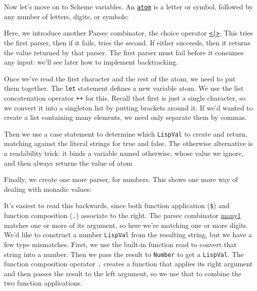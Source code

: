 Now let's move on to Scheme variables. An \href{http://www.schemers.org/Documents/Standards/R5RS/HTML/r5rs-Z-H-5.html\#\%_sec_2.1}{\texttt{atom}} is a letter or symbol, followed by any number of letters, digits, or symbols:
 
 
Here, we introduce another Parsec combinator, the choice operator \href{http://www.cs.uu.nl/~daan/download/parsec/parsec.html\#or}{\texttt{<|>}}. This tries the first parser, then if it fails, tries the second. If either succeeds, then it returns the value returned by that parser. The first parser must fail before it consumes any input: we'll see later how to implement backtracking.
 
Once we've read the first character and the rest of the atom, we need to put them together. The \verb|let| statement defines a new variable atom. We use the list concatenation operator \lstinline|++| for this. Recall that first is just a single character, so we convert it into a singleton list by putting brackets around it. If we'd wanted to create a list containing many elements, we need only separate them by commas.
 
Then we use a case statement to determine which \verb|LispVal| to create and return, matching against the literal strings for true and false. The otherwise alternative is a readability trick: it binds a variable named otherwise, whose value we ignore, and then always returns the value of atom
 
Finally, we create one more parser, for numbers. This shows one more way of dealing with monadic values:
 
 
It's easiest to read this backwards, since both function application (\verb|$|) and function composition (\verb|.|) associate to the right. The parsec combinator \href{http://www.cs.uu.nl/~daan/download/parsec/parsec.html\#many1}{many1} matches one or more of its argument, so here we're matching one or more digits. We'd like to construct a number \verb|LispVal| from the resulting string, but we have a few type mismatches. First, we use the built-in function read to convert that string into a number. Then we pass the result to \verb|Number| to get a \verb|LispVal|. The function composition operator \verb|.| creates a function that applies its right argument and then passes the result to the left argument, so we use that to combine the two function applications.
 
